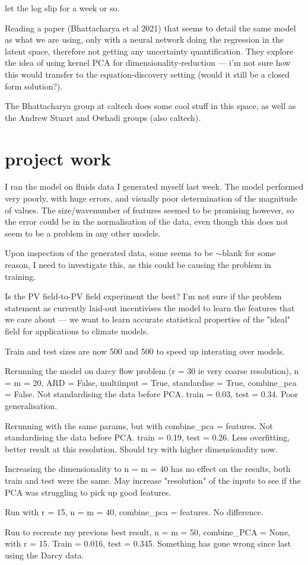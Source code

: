 \documentclass[11pt,a4paper]{article}
\begin{document}
let the log slip for a week or so.

Reading a paper (Bhattacharya et al 2021) that seems to detail the same model as what we are using, only with a neural network doing the regression in the latent space, therefore not getting any uncertainty quantification.
They explore the idea of using kernel PCA for dimensionality-reduction --- i'm not sure how this would transfer to the equation-discovery setting (would it still be a closed form solution?).

The Bhattacharya group at caltech does some cool stuff in this space, as well as the Andrew Stuart and Owhadi groups (also caltech). 

\section{project work}
I ran the model on fluids data I generated myself last week.
The model performed very poorly, with huge errors, and visually poor determination of the magnitude of values. 
The size/wavenumber of features seemed to be promising however, so the error could be in the normalisation of the data, even though this does not seem to be a problem in any other models.

Upon inspection of the generated data, some seems to be $\sim$blank for some reason, I need to investigate this, as this could be causing the problem in training.

Is the PV field-to-PV field experiment the best?
I'm not sure if the problem statement as currently laid-out incentivises the model to learn the features that we care about --- we want to learn accurate statistical properties of the "ideal" field for applications to climate models.

Train and test sizes are now 500 and 500 to speed up interating over models.

Rerunning the model on darcy flow problem (r = 30 ie very coarse resolution), n = m = 20, ARD = False, multiinput = True, standardise = True, combine\_pca = False.
Not standardising the data before PCA.
train = 0.03, test = 0.34.
Poor generalisation.

Rerunning with the same params, but with combine\_pca = features.
Not standardising the data before PCA.
train = 0.19, test = 0.26.
Less overfitting, better result at this resolution.
Should try with higher dimensionality now.

Increasing the dimensionality to n = m = 40 has no effect on the results, both train and test were the same.
May increase "resolution" of the inputs to see if the PCA was struggling to pick up good features.

Run with r = 15, n = m = 40, combine\_pca = features.
No difference.

Run to recreate my previous best result, n = m = 50, combine\_PCA = None, with r = 15.
Train = 0.016, test = 0.345.
Something has gone wrong since last using the Darcy data.
\end{document}
